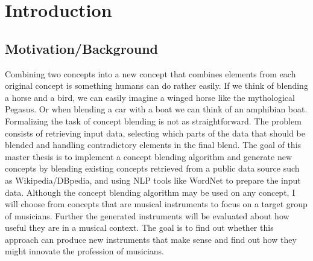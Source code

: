 
\chapter{Introduction} %

\label{Chapter1} %


\newcommand{\keyword}[1]{\textbf{#1}}
\newcommand{\tabhead}[1]{\textbf{#1}}
\newcommand{\code}[1]{\texttt{#1}}
\newcommand{\file}[1]{\texttt{\bfseries#1}}
\newcommand{\option}[1]{\texttt{\itshape#1}}


\section{Motivation/Background}
Combining two concepts into a new concept that combines elements from each original concept is something humans can do rather easily. If we think of blending a horse and a bird, we can easily imagine a winged horse like the mythological Pegasus. Or when blending a car with a boat we can think of an amphibian boat. Formalizing the task of concept blending is not as straightforward. The problem consists of retrieving input data, selecting which parts of the data that should be blended and handling contradictory elements in the final blend.
The goal of this master thesis is to implement a concept blending algorithm and generate new concepts by blending existing concepts retrieved from a public data source such as Wikipedia/DBpedia, and using NLP tools like WordNet to prepare the input data. Although the concept blending algorithm may be used on any concept, I will choose from concepts that are musical instruments to focus on a target group of musicians. Further the generated instruments will be evaluated about how useful they are in a musical context. The goal is to find out whether this approach can produce new instruments that make sense and find out how they might innovate the profession of musicians.



